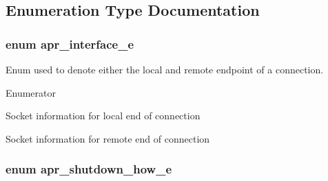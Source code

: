 \subsection{Enumeration Type Documentation}
\hypertarget{group__apr__network__io_ga1982f44f48fdf00a8bd754bc7b773edc}{
\subsubsection[{apr\-\_\-interface\-\_\-e}]{\setlength{\rightskip}{0pt plus 5cm}enum {\bf apr\-\_\-interface\-\_\-e}}}\label{group__apr__network__io_ga1982f44f48fdf00a8bd754bc7b773edc}
Enum used to denote either the local and remote endpoint of a connection. \begin{Desc}
\item[Enumerator]\par
\begin{description}
\item[{\em 
\hypertarget{group__apr__network__io_gga1982f44f48fdf00a8bd754bc7b773edca6c23a4bf48b8f93dff08adf827382616}{A\-P\-R\-\_\-\-L\-O\-C\-A\-L}\label{group__apr__network__io_gga1982f44f48fdf00a8bd754bc7b773edca6c23a4bf48b8f93dff08adf827382616}
}]Socket information for local end of connection \item[{\em 
\hypertarget{group__apr__network__io_gga1982f44f48fdf00a8bd754bc7b773edcaeb8be70b031f06a513ac0ebcaa5bac8a}{A\-P\-R\-\_\-\-R\-E\-M\-O\-T\-E}\label{group__apr__network__io_gga1982f44f48fdf00a8bd754bc7b773edcaeb8be70b031f06a513ac0ebcaa5bac8a}
}]Socket information for remote end of connection \end{description}
\end{Desc}
\hypertarget{group__apr__network__io_gae2130f1fa2d0db58c5c3c9c73d9b4009}{
\subsubsection[{apr\-\_\-shutdown\-\_\-how\-\_\-e}]{\setlength{\rightskip}{0pt plus 5cm}enum {\bf apr\-\_\-shutdown\-\_\-how\-\_\-e}}}\label{group__apr__network__io_gae2130f1fa2d0db58c5c3c9c73d9b4009}
